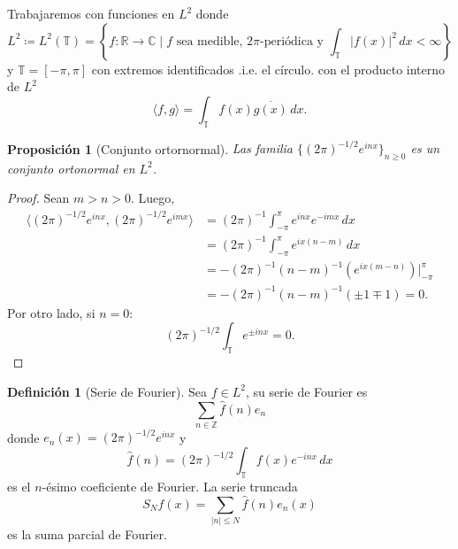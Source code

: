\documentclass{article}
\newtheorem{Proposicion}{Proposición}
\theoremstyle{plain}
\theoremstyle{definition}
\newtheorem{Definicion}{Definición}
\newcommand{\T}{\mathbb{T}}
\newcommand{\C}{\mathbb{C}}
\newcommand{\R}{\mathbb{R}}
\newcommand{\Z}{\mathbb{Z}}
\newcommand{\abs}[1]{\lvert #1 \rvert}
\begin{document}
\noindent{}
\newline

Trabajaremos con funciones en \(L^2\) donde 
\begin{displaymath}
  L^2 \coloneqq 
  L^{2}(\T)
  =
  \left\{ 
    f\colon \R \to \C
    \mid 
    f \text{ sea medible, \(2\pi\){-}periódica y }
    \int_{\T} \abs{f(x)}^2 \, dx < \infty
  \right\} 
\end{displaymath}
y \(\T = [-\pi,\pi]\) con extremos identificados .i.e. el círculo. 
con el producto interno de \(L^2\)
\begin{displaymath}
  \langle f,g \rangle
  =
  \int_{\T} f(x) \overline{g(x)} \, dx.
\end{displaymath}

\begin{Proposicion}[Conjunto ortornormal]
  Las familia \(\lbrace (2\pi)^{-1/2} e^{inx} \rbrace_{n\ge 0}\) es un conjunto ortonormal
  en \(L^2\).
\end{Proposicion}
\begin{proof}
  Sean \(m > n > 0\). Luego,
  \begin{align*}
    \langle (2\pi)^{-1/2} e^{inx}, (2\pi)^{-1/2} e^{imx} \rangle
    &=
    (2\pi)^{-1}
    \int_{-\pi}^{\pi} 
      e^{inx} e^{-imx}
      \, dx
    \\&=
    (2\pi)^{-1}
    \int_{-\pi}^{\pi} 
      e^{ix(n-m)}
      \, dx
    \\&=
    -(2\pi)^{-1} (n-m)^{-1}
    \left( e^{ix(m-n)} \right)\big\vert_{-\pi}^{\pi}
    \\&=
    -(2\pi)^{-1} (n-m)^{-1}
    (\pm 1 \mp 1)
    = 0.
  \end{align*} 
  Por otro lado, si \(n=0\):
  \begin{displaymath}
    (2\pi)^{-1/2} \int_{\T} e^{\pm inx} = 0.
  \end{displaymath}
\end{proof}

\begin{Definicion}[Serie de Fourier]
  Sea \(f\in L^2\), su serie de Fourier es
  \begin{displaymath}
    \sum_{n\in\Z} \hat f(n) e_{n}
  \end{displaymath}
  donde \(e_n(x) = (2\pi)^{-1/2} e^{inx}\) y 
  \begin{displaymath}
    \hat f(n) = (2\pi)^{-1/2} \int_{\T} f(x) e^{-inx} \, dx
  \end{displaymath}
  es el \(n\){-}ésimo coeficiente de Fourier. La serie truncada
  \begin{displaymath}
    S_N f(x) = \sum_{\abs{n} \le N} \hat f(n) e_{n}(x)
  \end{displaymath}
  es la suma parcial de Fourier.
\end{Definicion}
\end{document}
